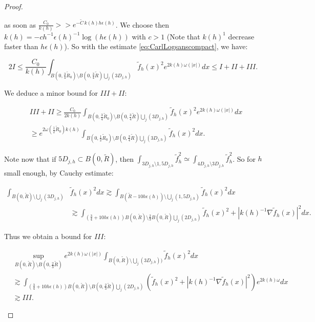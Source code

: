\documentclass[leqno,11pt,letterpaper, english]{amsart}
\newcommand{\nn}{\nonumber}
\theoremstyle{plain}
\theoremstyle{definition}
\numberwithin{equation}{section}
\begin{document}
\begin{proof}
\begin{itemize}
			as soon as $\frac{C_0}{k(h)}>>e^{-\tilde{C}\,k(h)h\epsilon(h)}$. We choose then $k(h)=-c h^{-1}\epsilon(h)^{-1}\log(h\epsilon(h))$ with $c>1$ (Note that $k(h)^{1}$ decrease faster than $h\epsilon(h)$). 
			So with the estimate \ref{eq:CarlLogsanscompact}, we have:
			
			\begin{equation}
				2I \leq \frac{C_0}{k(h)}\int_{B(0,\frac{3}{4}\tilde{R}_0)\setminus  B(0,\frac{3}{4}\tilde{R})\bigcup_j(3D_{j,h})} \tilde{f}_h(x)^2 e^{2k(h)\omega(|x|)}dx \leq I + II+III.
			\end{equation}
			
			We deduce a minor bound for $III+II$: 
			
			
			\begin{align}
				& III+II\geq  \frac{C_0}{2k(h)}\int_{B(0,\frac{3}{4}\tilde{R}_0)\setminus B(0, \frac{3}{4}\tilde{R})\bigcup_j(3D_{j,h})} \tilde{f}_h(x)^2 e^{2k(h)\omega(|x|)}dx\nn\\
				&\geq e^{2\omega(\frac{1}{2}\tilde{R}_0) k(h)}\int_{B(0,\frac{1}{2}\tilde{R}_0)\setminus  B(0,\frac{3}{4}\tilde{R})\bigcup_j(3D_{j,h})} \tilde{f}_h(x)^2dx.
			\end{align}
			
			Note now that if $5D_{j,h}\subset B(0,\tilde{R})$, then $\int_{3D_{j,h}\setminus 1,5D_{j,h}}\tilde{f}_h^2\simeq \int_{4D_{j,h}\setminus 3D_{j,h}}\tilde{f}_h^2$. So for $h$ small enough, by Cauchy estimate:
			
			\begin{align}
				\int_{B(0,\tilde{R})\setminus \bigcup_j(3D_{j,h})}& \tilde{f}_h(x)^2dx  \gtrsim \int_{B(\tilde{R}-10h\epsilon(h))\setminus  \bigcup_j(1,5D_{j,h})}\tilde{f}_h(x)^2dx\nn\\
				&\gtrsim \int_{(\frac{3}{4}+10h\epsilon(h))B(0,\tilde{R})\setminus \frac{2}{3}B(0,\tilde{R}) \bigcup_j(2D_{j,h})} \tilde{f}_h(x)^2+|k(h)^{-1}\nabla \tilde{f}_h(x)|^2dx.
			\end{align}
			
			Thus we obtain a bound for $III$:
			
			\begin{align}
				&\sup_{B(0,\tilde{R})\setminus B(0,\frac{2}{3}\tilde{R})}e^{2k(h)\omega(|x|)}\int_{B(0,\tilde{R})\setminus \bigcup_j(3D_{j,h}))} \tilde{f}_h(x)^2dx\nn\\
				&\gtrsim\int_{(\frac{3}{4}+10h\epsilon(h))B(0,\tilde{R})\setminus B(0,\frac{2}{3}\tilde{R}) \bigcup_j(2D_{j,h})} (\tilde{f}_h(x)^2+|k(h)^{-1}\nabla \tilde{f}_h(x)|^2)e^{2k(h)\omega}dx\nn\\
				&\gtrsim III.
			\end{align}
			

\end{itemize}
\end{proof}
\end{document}
